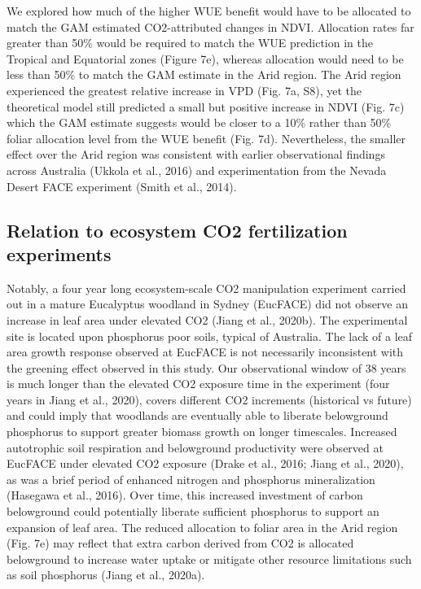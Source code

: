 \documentclass[gc, manuscript]{copernicus}
\begin{document}
We explored how much of the higher WUE benefit would have to be
allocated to match the GAM estimated CO2-attributed changes in NDVI.
Allocation rates far greater than 50\% would be required to match the
WUE prediction in the Tropical and Equatorial zones (Figure 7e), whereas
allocation would need to be less than 50\% to match the GAM estimate in
the Arid region. The Arid region experienced the greatest relative
increase in VPD (Fig. 7a, S8), yet the theoretical model still predicted
a small but positive increase in NDVI (Fig. 7c) which the GAM estimate
suggests would be closer to a 10\% rather than 50\% foliar allocation
level from the WUE benefit (Fig. 7d). Nevertheless, the smaller effect
over the Arid region was consistent with earlier observational findings
across Australia (Ukkola et al., 2016) and experimentation from the
Nevada Desert FACE experiment (Smith et al., 2014).

\subsection{Relation to ecosystem CO2 fertilization experiments}

Notably, a four year long ecosystem-scale CO2 manipulation experiment
carried out in a mature Eucalyptus woodland in Sydney (EucFACE) did not
observe an increase in leaf area under elevated CO2 (Jiang et al.,
2020b). The experimental site is located upon phosphorus poor soils,
typical of Australia. The lack of a leaf area growth response observed
at EucFACE is not necessarily inconsistent with the greening effect
observed in this study. Our observational window of 38 years is much
longer than the elevated CO2 exposure time in the experiment (four years
in Jiang et al., 2020), covers different CO2 increments (historical vs
future) and could imply that woodlands are eventually able to liberate
belowground phosphorus to support greater biomass growth on longer
timescales. Increased autotrophic soil respiration and belowground
productivity were observed at EucFACE under elevated CO2 exposure (Drake
et al., 2016; Jiang et al., 2020), as was a brief period of enhanced
nitrogen and phosphorus mineralization (Hasegawa et al., 2016). Over
time, this increased investment of carbon belowground could potentially
liberate sufficient phosphorus to support an expansion of leaf area. The
reduced allocation to foliar area in the Arid region (Fig. 7e) may
reflect that extra carbon derived from CO2 is allocated belowground to
increase water uptake or mitigate other resource limitations such as
soil phosphorus (Jiang et al., 2020a).
\end{document}
